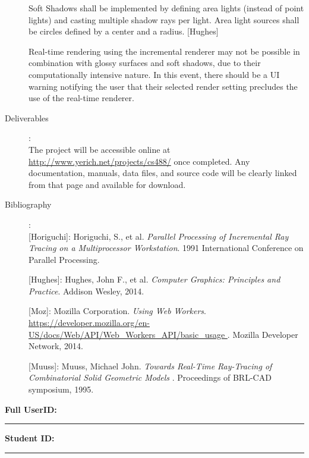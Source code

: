 \documentclass[12pt]{article}
\begin{document}
\begin{description}
    Soft Shadows shall be implemented by defining area lights (instead of point lights)
    and casting multiple shadow rays per light. Area light sources shall be circles
    defined by a center and a radius. [Hughes]
    
    Real-time rendering using the incremental renderer may not be possible in combination
    with glossy surfaces and soft shadows, due to their computationally intensive nature.
    In this event, there should be a UI warning notifying the user that their selected
    render setting precludes the use of the real-time renderer.

\item[Deliverables]:\\
	The project will be accessible online at \url{http://www.yerich.net/projects/cs488/}
	once completed. Any documentation, manuals, data files, and source code will be
	clearly linked from that page and available for download.

\item[Bibliography]:\\
     {[}Horiguchi{]}: Horiguchi, S., et al. {\it Parallel Processing of Incremental Ray Tracing on a Multiprocessor Workstation}. 1991 International Conference on Parallel Processing.

     {[}Hughes{]}: Hughes, John F., et al. {\it Computer Graphics: Principles and Practice}. Addison Wesley, 2014. 
     
     {[}Moz{]}: Mozilla Corporation. {\it Using Web Workers}. \url{https://developer.mozilla.org/en-US/docs/Web/API/Web_Workers_API/basic_usage }. Mozilla Developer Network, 2014. 
     
     {[}Muuss{]}: Muuss, Michael John. {\it Towards Real-Time Ray-Tracing of Combinatorial Solid Geometric Models }. Proceedings of BRL-CAD symposium, 1995.

\end{description}
\newpage



{\hfill{\bf Full UserID:\rule{2in}{.1mm}}\hfill{\bf Student ID:\rule{2in}{.1mm}}\hfill}
\end{document}
